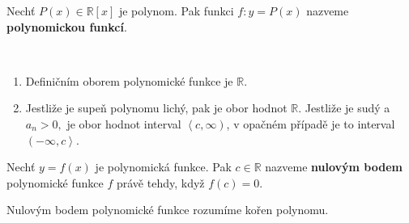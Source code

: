 \begin{definition}
    Nechť $P(x)\in \mathbb R[x]$ je polynom. Pak funkci $f:y=P(x)$ nazveme \textbf{polynomickou funkcí}.
\end{definition}

\begin{pozn}\,
    \begin{enumerate}[$i.$]
        \item Definičním oborem polynomické funkce je $\mathbb R.$
        \item Jestliže je supeň polynomu lichý, pak je obor hodnot $\mathbb R.$ Jestliže je sudý a $a_n > 0,$ je obor hodnot interval $\left <c,\infty \right )$,
        v opačném případě je to interval $\left (-\infty, c\right >$.
    \end{enumerate}
\end{pozn}

\begin{definition}
    Nechť $y=f(x)$ je polynomická funkce. Pak $c\in \mathbb R$ nazveme \textbf{nulovým bodem} polynomické funkce $f$ právě tehdy, když $f(c)=0.$
\end{definition}

\begin{pozn}
    Nulovým bodem polynomické funkce rozumíme kořen polynomu.
\end{pozn}
